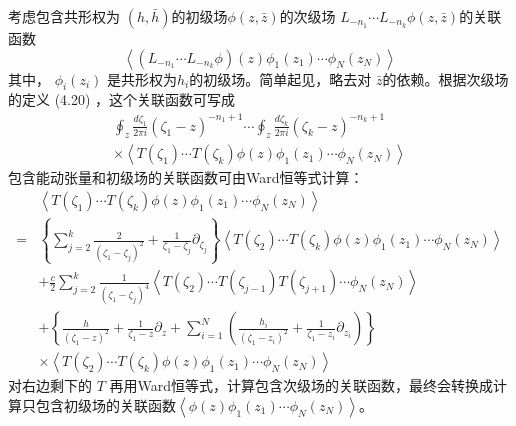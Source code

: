 考虑包含共形权为 $(h,\bar{h}) $的初级场$ \phi(z,\bar{z}) $的次级场 $L_{-n_{1}} \cdots L_{-n_{k}}\phi(z,\bar{z}) $的关联函数
\begin{equation}
	\left\langle\left(L_{-n_{1}} \cdots L_{-n_{k}} \phi\right)(z) \phi_{1}\left(z_{1}\right) \cdots \phi_{N}\left(z_{N}\right)\right\rangle
\end{equation}
其中， $\phi_i(z_i)$ 是共形权为$ h_i $的初级场。简单起见，略去对 $\bar{z} $的依赖。根据次级场的定义 (4.20) ，这个关联函数可写成
\begin{equation}
	\begin{aligned} \oint_{z} \frac{d \zeta_{1}}{2 \pi i}\left(\zeta_{1}-z\right)^{-n_{1}+1} \cdots \oint_{z} \frac{d \zeta_{k}}{2 \pi i}\left(\zeta_{k}-z\right)^{-n_{k}+1} \\ \times\left\langle T\left(\zeta_{1}\right) \cdots T\left(\zeta_{k}\right) \phi(z) \phi_{1}\left(z_{1}\right) \cdots \phi_{N}\left(z_{N}\right)\right\rangle \end{aligned}
\end{equation}
包含能动张量和初级场的关联函数可由Ward恒等式计算：
\begin{equation}
	\begin{aligned} &\left\langle T\left(\zeta_{1}\right) \cdots T\left(\zeta_{k}\right) \phi(z) \phi_{1}\left(z_{1}\right) \cdots \phi_{N}\left(z_{N}\right)\right\rangle \\ =&\left\{\sum_{j=2}^{k} \frac{2}{\left(\zeta_{1}-\zeta_{j}\right)^{2}}+\frac{1}{\zeta_{1}-\zeta_{j}} \partial_{\zeta_{j}}\right\}\left\langle T\left(\zeta_{2}\right) \cdots T\left(\zeta_{k}\right) \phi(z) \phi_{1}\left(z_{1}\right) \cdots \phi_{N}\left(z_{N}\right)\right\rangle \\ &+\frac{c}{2} \sum_{j=2}^{k} \frac{1}{\left(\zeta_{1}-\zeta_{j}\right)^{4}}\left\langle T\left(\zeta_{2}\right) \cdots T\left(\zeta_{j-1}\right) T\left(\zeta_{j+1}\right) \cdots \phi_{N}\left(z_{N}\right)\right\rangle \\ &+\left\{\frac{h}{\left(\zeta_{1}-z\right)^{2}}+\frac{1}{\zeta_{1}-z} \partial_{z}+\sum_{i=1}^{N}\left(\frac{h_{i}}{\left(\zeta_{1}-z_{i}\right)^{2}}+\frac{1}{\zeta_{1}-z_{i}} \partial_{z_{i}}\right)\right\} \\ & \times\left\langle T\left(\zeta_{2}\right) \cdots T\left(\zeta_{k}\right) \phi(z) \phi_{1}\left(z_{1}\right) \cdots \phi_{N}\left(z_{N}\right)\right\rangle \end{aligned}
\end{equation}
对右边剩下的 $T$ 再用Ward恒等式，计算包含次级场的关联函数，最终会转换成计算只包含初级场的关联函数$ \left\langle\phi(z) \phi_{1}\left(z_{1}\right) \cdots \phi_{N}\left(z_{N}\right)\right\rangle $。

